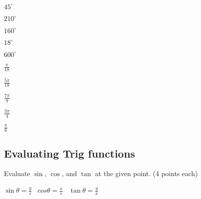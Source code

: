 \documentclass[12pt]{article}
\begin{document}
\begin{enumerate}[resume]
\begin{multicols}{2}

\item $45^\circ$\\

\item $210^\circ$\\

\item $160^\circ$\\

\item $18^\circ$\\

\item $600^\circ$\\

\columnbreak

\item $\frac{\pi}{18}$\\

\item $\frac{5\pi}{18}$\\

\item $\frac{7\pi}{9}$\\

\item $\frac{3\pi}{4}$\\

\item $\frac{\pi}{6}$\\

\end{multicols}
\end{enumerate}


\pagebreak

\subsection*{Evaluating Trig functions}

Evaluate $\sin$, $\cos$, and $\tan$ at the given point. (4 points each)\\

\begin{center}
$\sin\theta=\frac{y}{r}$ \ $cos\theta=\frac{x}{r}$ \ $\tan\theta=\frac{y}{x}$\\
\end{center}

\vspace{12pt}
\end{document}
